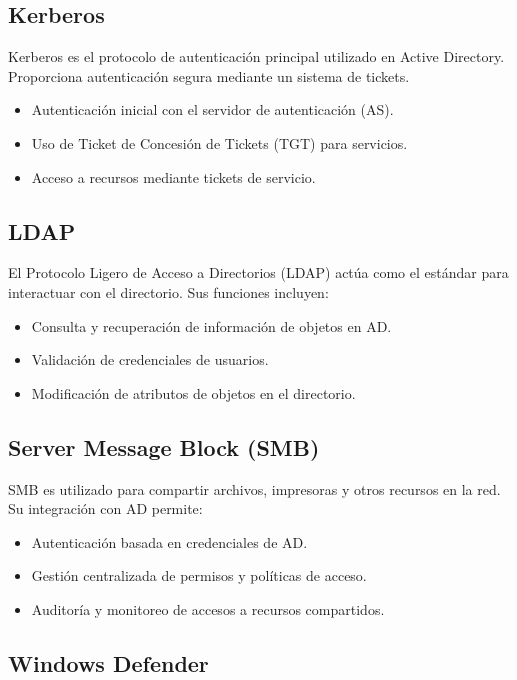 \subsection{Kerberos}

Kerberos es el protocolo de autenticación principal utilizado en Active
Directory. Proporciona autenticación segura mediante un sistema de tickets.
\begin{itemize}
    \item Autenticación inicial con el servidor de autenticación (AS).
    \item Uso de Ticket de Concesión de Tickets (TGT) para servicios.
    \item Acceso a recursos mediante tickets de servicio.
\end{itemize}

\subsection{LDAP}

El Protocolo Ligero de Acceso a Directorios (LDAP) actúa como el estándar para
interactuar con el directorio. Sus funciones incluyen:
\begin{itemize}
    \item Consulta y recuperación de información de objetos en AD.
    \item Validación de credenciales de usuarios.
    \item Modificación de atributos de objetos en el directorio.
\end{itemize}

\subsection{Server Message Block (SMB)}

SMB es utilizado para compartir archivos, impresoras y otros recursos en la
red. Su integración con AD permite:
\begin{itemize}
    \item Autenticación basada en credenciales de AD.
    \item Gestión centralizada de permisos y políticas de acceso.
    \item Auditoría y monitoreo de accesos a recursos compartidos.
\end{itemize}

\subsection{Windows Defender}

